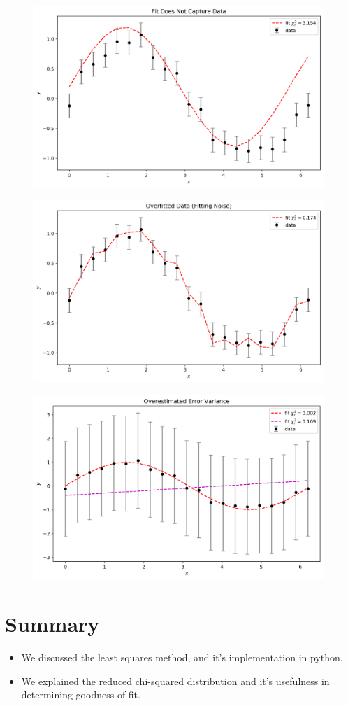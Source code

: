 \documentclass[12pt]{article}
\numberwithin{equation}{section}
\begin{document}
\begin{itemize}
\begin{figure}[H]
	\centering
	\includegraphics[width=11cm] {bad}
\end{figure}
\begin{figure}[H]
	\centering
	\includegraphics[width=11cm] {over}
\end{figure}
\begin{figure}[H]
	\centering
	\includegraphics[width=11cm] {var}
\end{figure}

\end{itemize}

\section{Summary}
\begin{itemize}
	\item We discussed the least squares method, and it's implementation in python.
	\item We explained the reduced chi-squared distribution and it's usefulness in determining goodness-of-fit.
\end{itemize}
\end{document}
